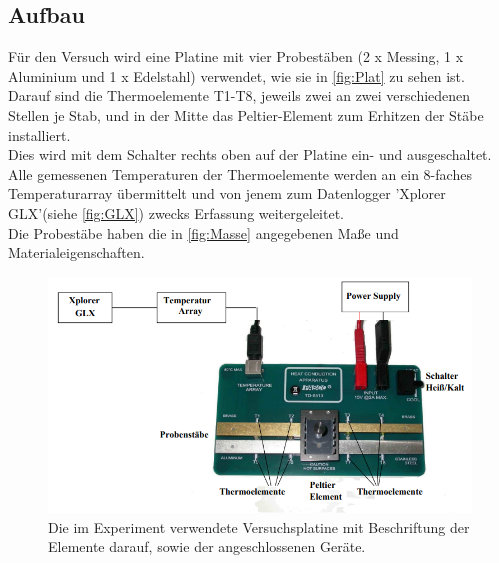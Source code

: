 \subsection{Aufbau}
\label{subsec:Aufbau}
Für den Versuch wird eine Platine mit vier Probestäben (2 x Messing, 1 x Aluminium und 1 x Edelstahl)
verwendet, wie sie in \autoref{fig:Plat} zu sehen ist. \\
Darauf sind die Thermoelemente T1-T8, jeweils zwei
an zwei verschiedenen Stellen je Stab, und in der Mitte das Peltier-Element zum Erhitzen der Stäbe installiert.\\
Dies wird mit dem Schalter rechts oben auf der Platine ein- und ausgeschaltet. \\
Alle gemessenen Temperaturen der Thermoelemente werden an ein 8-faches Temperaturarray
übermittelt und von jenem zum Datenlogger 'Xplorer GLX'(siehe \autoref{fig:GLX}) zwecks Erfassung weitergeleitet. \\
Die Probestäbe haben die in \autoref{fig:Masse} angegebenen Maße und Materialeigenschaften.
\begin{figure}[H]
    \centering
    \includegraphics[scale=0.8]{content/Aufbau.png}
    \caption{Die im Experiment verwendete Versuchsplatine mit Beschriftung der Elemente darauf, sowie der angeschlossenen Geräte. \cite{sample}}
    \label{fig:Plat}
\end{figure}
